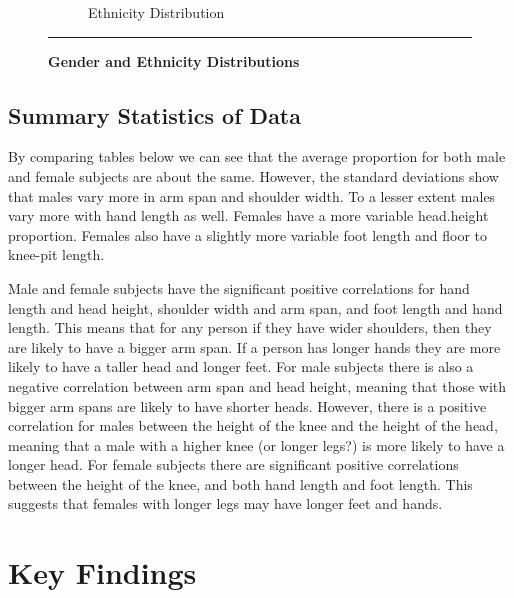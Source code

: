 \documentclass[]{article}
\begin{document}
\begin{figure}[!ht]
\begin{subfigure}[h]{0.5\textwidth}
            \caption{Ethnicity Distribution}
        \label{fig:ethnicity-plot}
    \end{subfigure}
    \vspace{2.5mm}
    \hrule
    \vspace{2.5mm}
        \caption{\textbf{ Gender and Ethnicity Distributions } }
        \label{fig:ge-plot}
\end{figure}

\newpage
\subsection{Summary Statistics of Data}
\label{sec:data-summary}

By comparing tables below we can see that the average proportion for
both male and female subjects are about the same. However, the standard
deviations show that males vary more in arm span and shoulder width. To
a lesser extent males vary more with hand length as well. Females have a
more variable head.height proportion. Females also have a slightly more
variable foot length and floor to knee-pit length.




Male and female subjects have the significant positive correlations for
hand length and head height, shoulder width and arm span, and foot
length and hand length. This means that for any person if they have
wider shoulders, then they are likely to have a bigger arm span. If a
person has longer hands they are more likely to have a taller head and
longer feet. For male subjects there is also a negative correlation
between arm span and head height, meaning that those with bigger arm
spans are likely to have shorter heads. However, there is a positive
correlation for males between the height of the knee and the height of
the head, meaning that a male with a higher knee (or longer legs?) is
more likely to have a longer head. For female subjects there are
significant positive correlations between the height of the knee, and
both hand length and foot length. This suggests that females with longer
legs may have longer feet and hands.

\section{Key Findings}
\label{sec:findings}
\end{document}
